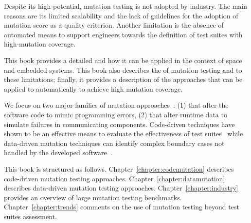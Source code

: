 Despite its high-potential, mutation testing is not adopted by industry. The main reasons are its limited scalability and the lack of guidelines for the adoption of mutation score as a quality criterion. Another limitation is the absence of automated means to support engineers towards the definition of test suites with high-mutation coverage.

This book provides a detailed  and how it can be applied in the context of space and embedded systems. 
This book also describes the  of mutation testing and  to these limitations; finally, it provides a description of the approaches that can be applied to automatically  to achieve high mutation coverage.

We focus on two major families of mutation approaches~\cite{natella2016assessing}: (1)  that alter the software code to mimic programming errors, (2)  that alter runtime data to simulate failures in communicating components. Code-driven techniques have shown to be an effective means to evaluate the effectiveness of test suites~\cite{Andrews06} while data-driven mutation techniques can identify complex boundary cases not handled by the developed software~\cite{di2015evolutionary}.

This book is structured as follows. 
Chapter~\ref{chapter:codemutation} describes code-driven mutation testing approaches. 
Chapter~\ref{chapter:datamutation} describes data-driven mutation testing approaches.
Chapter~\ref{chapter:industry} provides an overview of large mutation testing benchmarks.
Chapter~\ref{chapter:trends} comments on the use of mutation testing beyond test suites assessment.